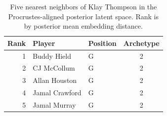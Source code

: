 \begin{table}[htbp]
  \centering\small
  \begin{tabular}{rllc}
    \toprule
    Rank & Player & Position & Archetype \\
    \midrule
    1 & Buddy Hield & G & 2 \\
    2 & CJ McCollum & G & 2 \\
    3 & Allan Houston & G & 2 \\
    4 & Jamal Crawford & G & 2 \\
    5 & Jamal Murray & G & 2 \\
    \bottomrule
  \end{tabular}
  \caption{Five nearest neighbors of Klay Thompson in the Procrustes-aligned posterior latent space. Rank is by posterior mean embedding distance.}
\end{table}


